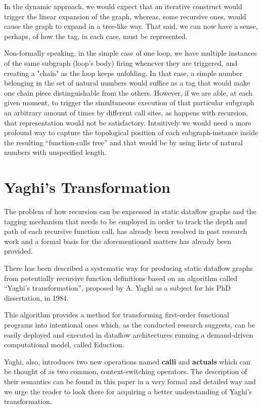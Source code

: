 \documentclass[ack,preface]{dithesis}
\begin{document}
In the dynamic approach, we would expect that an iterative construct would trigger the linear expansion of the graph, whereas, some recursive ones, would cause the graph to expand in a tree-like way. That said, we can now have a sense, perhaps, of how the tag, in each case, must be represented. 

Non-formally speaking, in the simple case of one  loop, we have multiple instances of the same subgraph (loop’s body) firing whenever they are triggered, and creating a "chain" as the loop keeps unfolding. In that case, a simple number belonging in the set of natural numbers would suffice as a tag that would make one chain piece distinguishable from the others. However, if we are able, at each given moment, to trigger the simultaneous execution of that particular subgraph an arbitrary amount of times by different call sites, as happens with recursion, that representation would not be satisfactory. Intuitively we would need a more profound way to capture the topological position of each subgraph-instance inside the resulting “function-calls tree” and that would be by using lists of natural numbers with unspecified length.

    \section{Yaghi's Transformation}
The problem of how recursion can be expressed in static dataflow graphs and the tagging mechanism that needs to be employed in order to track the depth and path of each recursive function call, has already been resolved in past research work and a formal basis for the aforementioned matters has already been provided.  \cite{Rondogiannis:1997}

There has been described a systematic way for producing static dataflow graphs from potentially recursive function definitions based on an algorithm called “Yaghi’s transformation”, proposed by A. Yaghi as a subject for his PhD dissertation, in 1984.

This algorithm provides a method for transforming first-order functional programs into intentional ones which, as the conducted research suggests, can be easily deployed and executed in dataflow architectures running a demand-driven computational model, called Eduction.

Yaghi, also, introduces two new operations named \textbf{calli} and \textbf{actuals} which can be  thought of as two common, context-switching operators. 
The description of their semantics can be found in this paper \cite{Rondogiannis:1997} in a very formal and detailed way and we urge the reader to look there for acquiring a better understanding of Yaghi's transformation.\\
\end{document}
